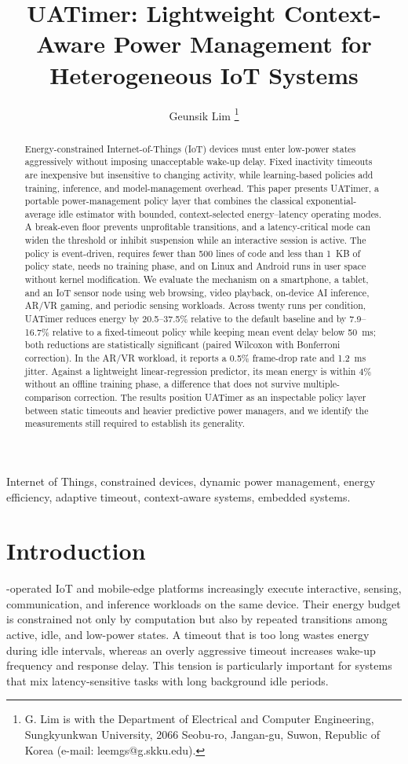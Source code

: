 \documentclass[journal]{IEEEtran}
\title{UATimer: Lightweight Context-Aware Power Management for Heterogeneous IoT Systems}
\author{Geunsik Lim%
\thanks{G. Lim is with the Department of Electrical and Computer Engineering, Sungkyunkwan University, 2066 Seobu-ro, Jangan-gu, Suwon, Republic of Korea (e-mail: leemgs@g.skku.edu).}%
}
\begin{document}
\maketitle

\begin{abstract}
Energy-constrained Internet-of-Things (IoT) devices must enter low-power states aggressively without imposing unacceptable wake-up delay. Fixed inactivity timeouts are inexpensive but insensitive to changing activity, while learning-based policies add training, inference, and model-management overhead. This paper presents UATimer, a portable power-management policy layer that combines the classical exponential-average idle estimator with bounded, context-selected energy--latency operating modes. A break-even floor prevents unprofitable transitions, and a latency-critical mode can widen the threshold or inhibit suspension while an interactive session is active. The policy is event-driven, requires fewer than 500 lines of code and less than 1~KB of policy state, needs no training phase, and on Linux and Android runs in user space without kernel modification. We evaluate the mechanism on a smartphone, a tablet, and an IoT sensor node using web browsing, video playback, on-device AI inference, AR/VR gaming, and periodic sensing workloads. Across twenty runs per condition, UATimer reduces energy by 20.5--37.5\% relative to the default baseline and by 7.9--16.7\% relative to a fixed-timeout policy while keeping mean event delay below 50~ms; both reductions are statistically significant (paired Wilcoxon with Bonferroni correction). In the AR/VR workload, it reports a 0.5\% frame-drop rate and 1.2~ms jitter. Against a lightweight linear-regression predictor, its mean energy is within 4\% without an offline training phase, a difference that does not survive multiple-comparison correction. The results position UATimer as an inspectable policy layer between static timeouts and heavier predictive power managers, and we identify the measurements still required to establish its generality.
\end{abstract}

\begin{IEEEkeywords}
Internet of Things, constrained devices, dynamic power management, energy efficiency, adaptive timeout, context-aware systems, embedded systems.
\end{IEEEkeywords}

\section{Introduction}
-operated IoT and mobile-edge platforms increasingly execute interactive, sensing, communication, and inference workloads on the same device. Their energy budget is constrained not only by computation but also by repeated transitions among active, idle, and low-power states. A timeout that is too long wastes energy during idle intervals, whereas an overly aggressive timeout increases wake-up frequency and response delay. This tension is particularly important for systems that mix latency-sensitive tasks with long background idle periods.
\end{document}
